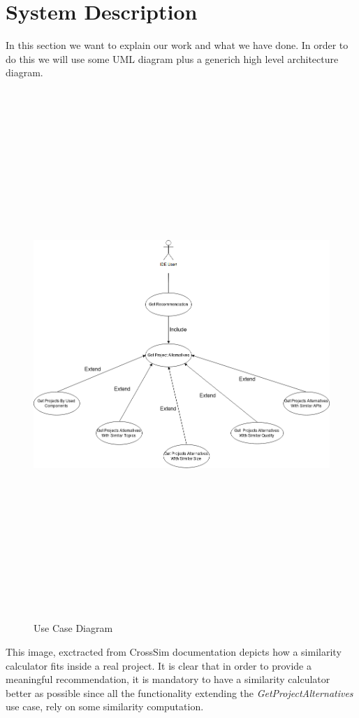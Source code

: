 \section{System Description}
In this section we want to explain our work and what we have done. In order to do this we will use some UML diagram plus a generich high level architecture diagram.
\begin{figure}[!h]
	\includegraphics[width=15cm,height=20cm,keepaspectratio]{images/UseCaseDiagram.png}
	\caption{Use Case Diagram}
	\label{fig:UseCase}
\end{figure}
This image, exctracted from CrossSim documentation depicts how a similarity calculator fits inside a real project.
It is clear that in order to provide a meaningful recommendation, it is mandatory to have a similarity calculator better as possible since all the functionality extending the \emph{GetProjectAlternatives} use case, rely on some similarity computation.



